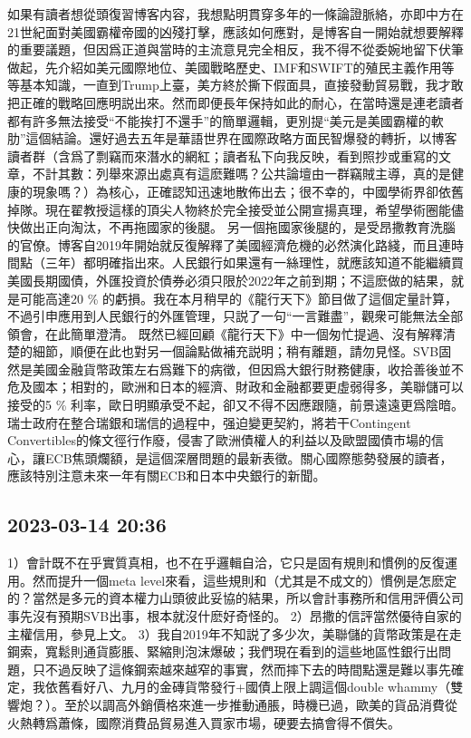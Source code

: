 \documentclass[twocolumn]{ctexart}
\begin{document}
如果有讀者想從頭復習博客内容，我想點明貫穿多年的一條論證脈絡，亦即中方在21世紀面對美國霸權帝國的凶殘打擊，應該如何應對，是博客自一開始就想要解釋的重要議題，但因爲正道與當時的主流意見完全相反，我不得不從委婉地留下伏筆做起，先介紹如美元國際地位、美國戰略歷史、IMF和SWIFT的殖民主義作用等等基本知識，一直到Trump上臺，美方終於撕下假面具，直接發動貿易戰，我才敢把正確的戰略回應明説出來。然而即便長年保持如此的耐心，在當時還是連老讀者都有許多無法接受“不能挨打不還手”的簡單邏輯，更別提“美元是美國霸權的軟肋”這個結論。還好過去五年是華語世界在國際政略方面民智爆發的轉折，以博客讀者群（含爲了剽竊而來潛水的網紅；讀者私下向我反映，看到照抄或重寫的文章，不計其數：列舉來源出處真有這麽難嗎？公共論壇由一群竊賊主導，真的是健康的現象嗎？）為核心，正確認知迅速地散佈出去；很不幸的，中國學術界卻依舊掉隊。現在翟教授這樣的頂尖人物終於完全接受並公開宣揚真理，希望學術圈能儘快做出正向淘汰，不再拖國家的後腿。
另一個拖國家後腿的，是受昂撒教育洗腦的官僚。博客自2019年開始就反復解釋了美國經濟危機的必然演化路綫，而且連時間點（三年）都明確指出來。人民銀行如果還有一絲理性，就應該知道不能繼續買美國長期國債，外匯投資於債券必須只限於2022年之前到期；不這麽做的結果，就是可能高達20 \% 的虧損。我在本月稍早的《龍行天下》節目做了這個定量計算，不過引申應用到人民銀行的外匯管理，只説了一句“一言難盡”，觀衆可能無法全部領會，在此簡單澄清。
既然已經回顧《龍行天下》中一個匆忙提過、沒有解釋清楚的細節，順便在此也對另一個論點做補充説明；稍有離題，請勿見怪。SVB固然是美國金融貨幣政策左右爲難下的病徵，但因爲大銀行財務健康，收拾善後並不危及國本；相對的，歐洲和日本的經濟、財政和金融都要更虛弱得多，美聯儲可以接受的5 \% 利率，歐日明顯承受不起，卻又不得不因應跟隨，前景遠遠更爲陰暗。瑞士政府在整合瑞銀和瑞信的過程中，强迫變更契約，將若干Contingent Convertibles的條文徑行作廢，侵害了歐洲債權人的利益以及歐盟國債市場的信心，讓ECB焦頭爛額，是這個深層問題的最新表徵。關心國際態勢發展的讀者，應該特別注意未來一年有關ECB和日本中央銀行的新聞。
\subsection*{2023-03-14 20:36}

1）會計既不在乎實質真相，也不在乎邏輯自洽，它只是固有規則和慣例的反復運用。然而提升一個meta level來看，這些規則和（尤其是不成文的）慣例是怎麽定的？當然是多元的資本權力山頭彼此妥協的結果，所以會計事務所和信用評價公司事先沒有預期SVB出事，根本就沒什麽好奇怪的。
2）昂撒的信評當然優待自家的主權信用，參見上文。
3）我自2019年不知説了多少次，美聯儲的貨幣政策是在走鋼索，寬鬆則通貨膨脹、緊縮則泡沫爆破；我們現在看到的這些地區性銀行出問題，只不過反映了這條鋼索越來越窄的事實，然而摔下去的時間點還是難以事先確定，我依舊看好八、九月的金磚貨幣發行+國債上限上調這個double whammy（雙響炮？）。至於以調高外銷價格來進一步推動通脹，時機已過，歐美的貨品消費從火熱轉爲蕭條，國際消費品貿易進入買家市場，硬要去搞會得不償失。
\end{document}

